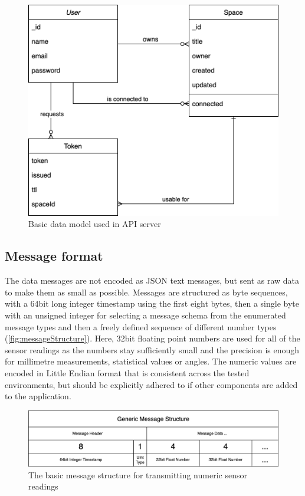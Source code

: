 \begin{figure}[h]
\centering
\includegraphics[scale=0.4]{04_Artefakte/01_Abbildungen/api-datamodel}
\caption[API data model]{Basic data model used in API server\protect}
\label{fig:apiDataModel}
\end{figure}

\subsection{Message format}

The data messages are not encoded as \ac{JSON} text messages, but sent as raw data to make them as small as possible.
Messages are structured as byte sequences, with a 64bit long integer timestamp using the first eight bytes, then a single byte with an unsigned integer for selecting a message schema from the enumerated message types and then a freely defined sequence of different number types (\autoref{fig:messageStructure}). Here, 32bit floating point numbers are used for all of the sensor readings as the numbers stay sufficiently small and the precision is enough for millimetre measurements, statistical values or angles.
The numeric values are encoded in Little Endian format that is consistent across the tested environments, but should be explicitly adhered to if other components are added to the application.

\begin{figure}[h]
\centering
\includegraphics[width=\textwidth]{04_Artefakte/01_Abbildungen/generic-message-structure}
\caption[Generic Message Structure]{The basic message structure for transmitting numeric sensor readings\protect}
\label{fig:messageStructure}
\end{figure}

